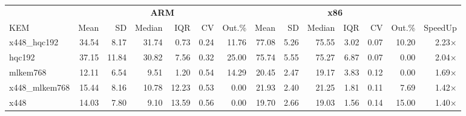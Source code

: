 \begin{table}[!ht]
\centering
\begin{tabular}{l|rrrrrr|rrrrrr|r}
\toprule
& \multicolumn{6}{c}{\bfseries ARM} & \multicolumn{6}{c}{\bfseries x86} & \\
\cmidrule(lr){2-7} \cmidrule(lr){8-13}
KEM & Mean & SD & Median & IQR & CV & Out.\% & Mean & SD & Median & IQR & CV & Out.\% & SpeedUp \\
\midrule
x448_hqc192 & 34.54 & 8.17 & 31.74 & 0.73 & 0.24 & 11.76 & 77.08 & 5.26 & 75.55 & 3.02 & 0.07 & 10.20 & 2.23× \\
hqc192 & 37.15 & 11.84 & 30.82 & 7.56 & 0.32 & 25.00 & 75.74 & 5.55 & 75.27 & 6.87 & 0.07 & 0.00 & 2.04× \\
mlkem768 & 12.11 & 6.54 & 9.51 & 1.20 & 0.54 & 14.29 & 20.45 & 2.47 & 19.17 & 3.83 & 0.12 & 0.00 & 1.69× \\
x448_mlkem768 & 15.44 & 8.16 & 10.78 & 12.23 & 0.53 & 0.00 & 21.93 & 2.40 & 21.25 & 1.81 & 0.11 & 7.69 & 1.42× \\
x448 & 14.03 & 7.80 & 9.10 & 13.59 & 0.56 & 0.00 & 19.70 & 2.66 & 19.03 & 1.56 & 0.14 & 15.00 & 1.40× \\
\bottomrule
\end{tabular}
\end{table}
